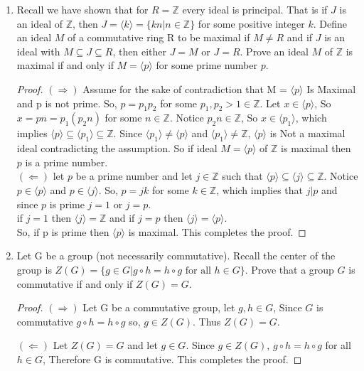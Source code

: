 \documentclass{article}
\newcommand{\Z}{\mathbb{Z}}
\begin{document}
\begin{enumerate}
		\item Recall we have shown that for $R = \Z$ every ideal is principal. 
		That is if $J$ is an ideal of $\Z$, then $J = \langle k\rangle = \{ kn | n \in \Z \}$ for some positive integer $k$.
		Define an ideal $M$ of a commutative ring R to be maximal if $M \neq R$ and if $J$ is an ideal with $M \subseteq J \subseteq R$, then either $J = M$ or $J = R$.
		Prove an ideal $M$ of $\Z$ is maximal if and only if $M = \langle p\rangle$ for some prime number $p$.
		\begin{proof}
			$(\Rightarrow)$ Assume for the sake of contradiction that M = $\langle p \rangle$ Is Maximal and p is not prime. 
			So, $p = p_1p_2$ for some $p_1, p_2 >1 \in \Z$.
			Let $x \in \langle p \rangle$, So $x = pn = p_1(p_2n)$ for some $n \in \Z$. 
			Notice $p_2n \in \Z$, So $x \in \langle p_1 \rangle$, which implies $\langle p \rangle \subseteq \langle p_1 \rangle \subseteq \Z$.
			Since $\langle p_1 \rangle \neq \langle p \rangle$ and $\langle p_1 \rangle \neq \Z$, $\langle p \rangle$ is Not a maximal ideal contradicting the assumption.
			So if ideal $M = \langle p\rangle$ of $\Z$ is maximal then $p$ is a prime number. \\

			$(\Leftarrow)$ let $p$ be a prime number and let $j \in \Z$ such that $\langle p \rangle \subseteq \langle j \rangle \subseteq \Z$.
			Notice $p \in \langle p \rangle$ and $p \in \langle j \rangle$. So, $p = jk$ for some $k \in \Z$, which implies that $j|p$ and since $p$ is prime $j = 1$ or $j=p$.\\
			if $j=1$ then $\langle j \rangle = \Z$ and if $j=p$ then $\langle j \rangle = \langle p \rangle$. \\
			So, if p is prime then $\langle p \rangle$ is maximal. This completes the proof. 
		\end{proof}

		\item Let G be a group (not necessarily commutative).
		Recall the center of the group is $Z(G) = \{g \in G | g \circ h = h \circ g \text{ for all } h \in G\}$.
		Prove that a group $G$ is commutative if and only if $Z(G) = G$.
		\begin{proof}
			$(\Rightarrow)$ Let G be a commutative group, let $g, h \in G$, Since $G$ is commutative $g \circ h = h \circ g$ so, $g \in Z(G)$. Thus $Z(G)=G$.

			$(\Leftarrow)$ Let $Z(G)=G$ and let $g \in G$. Since $g \in Z(G)$, $g \circ h = h \circ g$ for all $h\in G$, Therefore G is commutative. This completes the proof.
		\end{proof}
	\end{enumerate}
\end{document}
